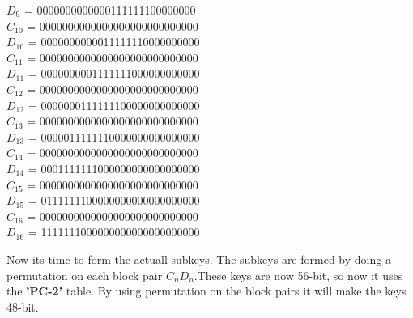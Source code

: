 $D_9$ = 0000000000000111111100000000\\
\bigskip
$C_{10}$ = 0000000000000000000000000000\\
$D_{10}$ = 0000000000011111110000000000\\
\bigskip
$C_{11}$ = 0000000000000000000000000000\\
$D_{11}$ = 0000000001111111000000000000\\
\bigskip
$C_{12}$ = 0000000000000000000000000000\\
$D_{12}$ = 0000000111111100000000000000\\
\bigskip
$C_{13}$ = 0000000000000000000000000000\\
$D_{13}$ = 0000011111110000000000000000\\
\bigskip
$C_{14}$ = 0000000000000000000000000000\\
$D_{14}$ = 0001111111000000000000000000\\
\bigskip
$C_{15}$ = 0000000000000000000000000000\\
$D_{15}$ = 0111111100000000000000000000\\
\bigskip
$C_{16}$ = 0000000000000000000000000000\\
$D_{16}$ = 1111111000000000000000000000\\
\bigskip

Now its time to form the actuall subkeys. The subkeys are formed by doing a permutation on each block pair $C_nD_n$.These keys are now 56-bit, so now it uses the \textbf{'PC-2'}  \cite{tableWiki} table. By using permutation on the block pairs it will make the keys 48-bit. \cite{des3,des1}\\
\bigskip

